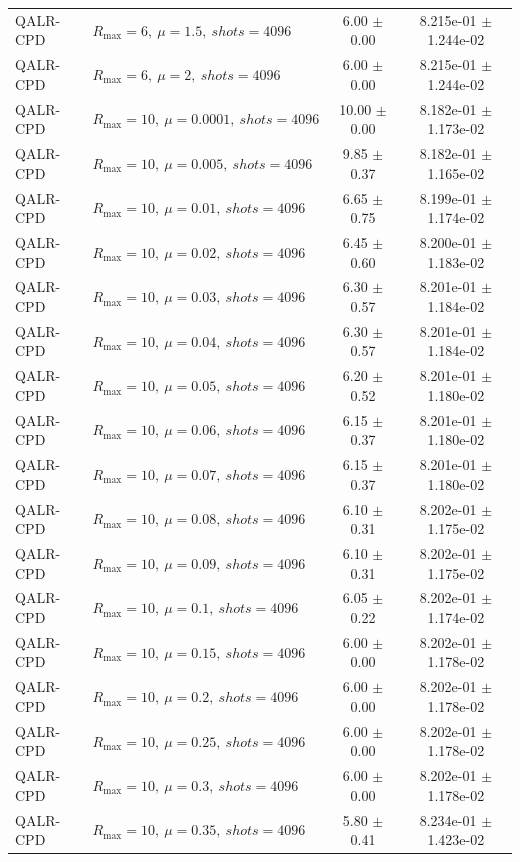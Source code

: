 \begin{table}[t]
\begin{tabular}{@{}llcc@{}}
QALR-CPD & \(R_{\max}=6,\ \mu=1.5,\ shots=4096\) & 6.00 $\pm$ 0.00 & 8.215e-01 $\pm$ 1.244e-02 \\
QALR-CPD & \(R_{\max}=6,\ \mu=2,\ shots=4096\) & 6.00 $\pm$ 0.00 & 8.215e-01 $\pm$ 1.244e-02 \\
QALR-CPD & \(R_{\max}=10,\ \mu=0.0001,\ shots=4096\) & 10.00 $\pm$ 0.00 & 8.182e-01 $\pm$ 1.173e-02 \\
QALR-CPD & \(R_{\max}=10,\ \mu=0.005,\ shots=4096\) & 9.85 $\pm$ 0.37 & 8.182e-01 $\pm$ 1.165e-02 \\
QALR-CPD & \(R_{\max}=10,\ \mu=0.01,\ shots=4096\) & 6.65 $\pm$ 0.75 & 8.199e-01 $\pm$ 1.174e-02 \\
QALR-CPD & \(R_{\max}=10,\ \mu=0.02,\ shots=4096\) & 6.45 $\pm$ 0.60 & 8.200e-01 $\pm$ 1.183e-02 \\
QALR-CPD & \(R_{\max}=10,\ \mu=0.03,\ shots=4096\) & 6.30 $\pm$ 0.57 & 8.201e-01 $\pm$ 1.184e-02 \\
QALR-CPD & \(R_{\max}=10,\ \mu=0.04,\ shots=4096\) & 6.30 $\pm$ 0.57 & 8.201e-01 $\pm$ 1.184e-02 \\
QALR-CPD & \(R_{\max}=10,\ \mu=0.05,\ shots=4096\) & 6.20 $\pm$ 0.52 & 8.201e-01 $\pm$ 1.180e-02 \\
QALR-CPD & \(R_{\max}=10,\ \mu=0.06,\ shots=4096\) & 6.15 $\pm$ 0.37 & 8.201e-01 $\pm$ 1.180e-02 \\
QALR-CPD & \(R_{\max}=10,\ \mu=0.07,\ shots=4096\) & 6.15 $\pm$ 0.37 & 8.201e-01 $\pm$ 1.180e-02 \\
QALR-CPD & \(R_{\max}=10,\ \mu=0.08,\ shots=4096\) & 6.10 $\pm$ 0.31 & 8.202e-01 $\pm$ 1.175e-02 \\
QALR-CPD & \(R_{\max}=10,\ \mu=0.09,\ shots=4096\) & 6.10 $\pm$ 0.31 & 8.202e-01 $\pm$ 1.175e-02 \\
QALR-CPD & \(R_{\max}=10,\ \mu=0.1,\ shots=4096\) & 6.05 $\pm$ 0.22 & 8.202e-01 $\pm$ 1.174e-02 \\
QALR-CPD & \(R_{\max}=10,\ \mu=0.15,\ shots=4096\) & 6.00 $\pm$ 0.00 & 8.202e-01 $\pm$ 1.178e-02 \\
QALR-CPD & \(R_{\max}=10,\ \mu=0.2,\ shots=4096\) & 6.00 $\pm$ 0.00 & 8.202e-01 $\pm$ 1.178e-02 \\
QALR-CPD & \(R_{\max}=10,\ \mu=0.25,\ shots=4096\) & 6.00 $\pm$ 0.00 & 8.202e-01 $\pm$ 1.178e-02 \\
QALR-CPD & \(R_{\max}=10,\ \mu=0.3,\ shots=4096\) & 6.00 $\pm$ 0.00 & 8.202e-01 $\pm$ 1.178e-02 \\
QALR-CPD & \(R_{\max}=10,\ \mu=0.35,\ shots=4096\) & 5.80 $\pm$ 0.41 & 8.234e-01 $\pm$ 1.423e-02 \\

\end{tabular}
\end{table}
